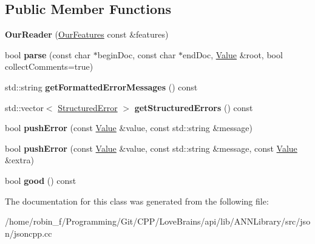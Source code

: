 \subsection*{Public Member Functions}
\begin{DoxyCompactItemize}
\item 
\hypertarget{class_json_1_1_our_reader_a48a850914b9c8d7781be172930c478e5}{}{\bfseries Our\+Reader} (\hyperlink{class_json_1_1_our_features}{Our\+Features} const \&features)\label{class_json_1_1_our_reader_a48a850914b9c8d7781be172930c478e5}

\item 
\hypertarget{class_json_1_1_our_reader_aba4f8749aab7f02ec17f107e392caf80}{}bool {\bfseries parse} (const char $\ast$begin\+Doc, const char $\ast$end\+Doc, \hyperlink{class_json_1_1_value}{Value} \&root, bool collect\+Comments=true)\label{class_json_1_1_our_reader_aba4f8749aab7f02ec17f107e392caf80}

\item 
\hypertarget{class_json_1_1_our_reader_ae9cbb7dbd9c6c96be37432e8dfa1afcb}{}std\+::string {\bfseries get\+Formatted\+Error\+Messages} () const \label{class_json_1_1_our_reader_ae9cbb7dbd9c6c96be37432e8dfa1afcb}

\item 
\hypertarget{class_json_1_1_our_reader_a02ef7871af3706754a233c36e6d489e9}{}std\+::vector$<$ \hyperlink{struct_json_1_1_our_reader_1_1_structured_error}{Structured\+Error} $>$ {\bfseries get\+Structured\+Errors} () const \label{class_json_1_1_our_reader_a02ef7871af3706754a233c36e6d489e9}

\item 
\hypertarget{class_json_1_1_our_reader_aef7aa4ca22ffaa38c401b16951d20e1e}{}bool {\bfseries push\+Error} (const \hyperlink{class_json_1_1_value}{Value} \&value, const std\+::string \&message)\label{class_json_1_1_our_reader_aef7aa4ca22ffaa38c401b16951d20e1e}

\item 
\hypertarget{class_json_1_1_our_reader_ad43315cbb0d6804e3b7177e84a1ec53d}{}bool {\bfseries push\+Error} (const \hyperlink{class_json_1_1_value}{Value} \&value, const std\+::string \&message, const \hyperlink{class_json_1_1_value}{Value} \&extra)\label{class_json_1_1_our_reader_ad43315cbb0d6804e3b7177e84a1ec53d}

\item 
\hypertarget{class_json_1_1_our_reader_a048346238d703ad9aed06beb686e6102}{}bool {\bfseries good} () const \label{class_json_1_1_our_reader_a048346238d703ad9aed06beb686e6102}

\end{DoxyCompactItemize}


The documentation for this class was generated from the following file\+:\begin{DoxyCompactItemize}
\item 
/home/robin\+\_\+f/\+Programming/\+Git/\+C\+P\+P/\+Love\+Brains/api/lib/\+A\+N\+N\+Library/src/json/jsoncpp.\+cc\end{DoxyCompactItemize}
